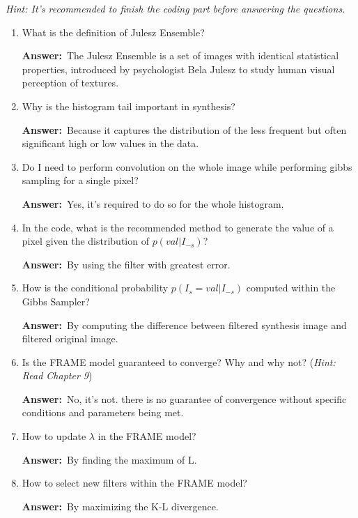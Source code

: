 \documentclass[11pt]{article}
\begin{document}
\noindent\textit{Hint: It's recommended to finish the coding part before answering the questions.} 
\begin{enumerate}
    \item What is the definition of Julesz Ensemble?
    
    \textbf{Answer:}\ The Julesz Ensemble is a set of images with identical statistical properties, introduced by psychologist Bela Julesz to study human visual perception of textures.

    \item Why is the histogram tail important in synthesis?
    
    \textbf{Answer:}\ Because it captures the distribution of the less frequent but often significant high or low values in the data.

    \item Do I need to perform convolution on the whole image while performing gibbs sampling for a single pixel?

    \textbf{Answer:}\ Yes, it's required to do so for the whole histogram.

    \item In the code, what is the recommended method to generate the value of a pixel given the distribution of $p(val|I_{-s})$?

    \textbf{Answer:}\ By using the filter with greatest error.

    \item How is the conditional probability $p(I_s = val|I_{-s})$ computed within the Gibbs Sampler?

    \textbf{Answer:}\ By computing the difference between filtered synthesis image and filtered original image.

    \item Is the FRAME model guaranteed to converge? Why and why not? (\textit{Hint: Read Chapter 9})

    \textbf{Answer:}\ No, it's not. there is no guarantee of convergence without specific conditions and parameters being met.

    \item How to update $\lambda$ in the FRAME model?

    \textbf{Answer:}\ By finding the maximum of L.

    \item How to select new filters within the FRAME model?

    \textbf{Answer:}\ By maximizing the K-L divergence.
\end{enumerate}
\end{document}
